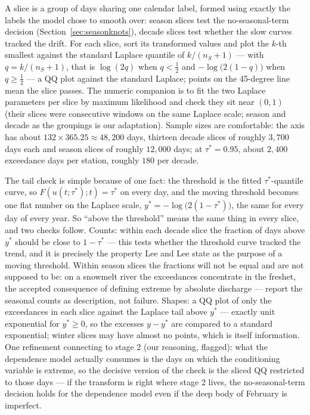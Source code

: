 \documentclass[11pt]{article}
\begin{document}
A slice is a group of days sharing one calendar label, formed using exactly the labels the model chose to smooth over: season slices test the no-seasonal-term decision (Section~\ref{sec:seasonknots}), decade slices test whether the slow curves tracked the drift. For each slice, sort its transformed values and plot the $k$-th smallest against {\color{green}the standard Laplace quantile of $k/(n_S + 1)$ --- with $q = k/(n_S + 1)$, that is $\log(2q)$ when $q < \tfrac{1}{2}$ and $-\log\bigl(2(1 - q)\bigr)$ when $q \ge \tfrac{1}{2}$ --- a QQ plot against the standard Laplace}; points on the 45-degree line mean the slice passes. The numeric companion is to fit the two {\color{green}Laplace} parameters per slice by maximum likelihood and check they sit near $(0, 1)$ (their slices were consecutive windows on the {\color{green}same} Laplace scale; season and decade as the groupings is our adaptation). Sample sizes are comfortable: the axis has about $132 \times 365.25 \approx 48{,}200$ days, thirteen decade slices of roughly $3{,}700$ days each and season slices of roughly $12{,}000$ days; at $\tau^{*} = 0.95$, about $2{,}400$ exceedance days per station, roughly $180$ per decade.

The tail check is simple because of one fact: the threshold is the fitted $\tau^{*}$-quantile curve, so $F(u(t; \tau^{*}); t) = \tau^{*}$ on every day, and the moving threshold becomes one flat number on the {\color{green}Laplace scale, $y^{*} = -\log\bigl(2(1 - \tau^{*})\bigr)$}, the same for every day of every year. So ``above the threshold'' means the same thing in every slice, and two checks follow. Counts: within each decade slice the fraction of days above $y^{*}$ should be close to $1 - \tau^{*}$ --- this tests whether the threshold curve tracked the trend, and it is precisely the property Lee and Lee state as the purpose of a moving threshold. Within season slices the fractions will not be equal and are not supposed to be: on a snowmelt river the exceedances concentrate in the freshet, the accepted consequence of defining extreme by absolute discharge --- report the seasonal counts as description, not failure. Shapes: a QQ plot of only the exceedances in each slice against the {\color{green}Laplace tail above $y^{*}$ --- exactly unit exponential for $y^{*} \ge 0$, so the excesses $y - y^{*}$ are compared to a standard exponential}; winter slices may have almost no points, which is itself information. One refinement connecting to stage 2 (our reasoning, flagged): what the dependence model actually consumes is the days on which the conditioning variable is extreme, so the decisive version of the check is the sliced QQ restricted to those days --- if the transform is right where stage 2 lives, the no-seasonal-term decision holds for the dependence model even if the deep body of February is imperfect.
\end{document}
